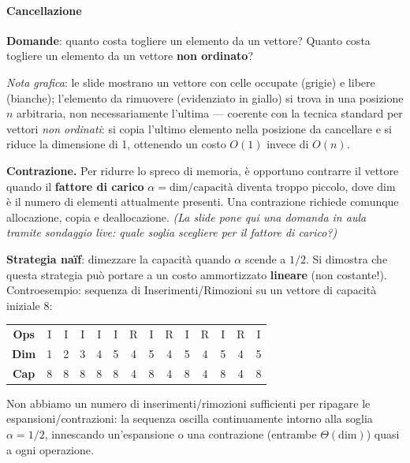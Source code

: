 \documentclass[12pt, a4paper]{article}
\begin{document}
\paragraph{Cancellazione}

\textbf{Domande}: quanto costa togliere un elemento da un vettore? Quanto costa togliere un elemento da un vettore \textbf{non ordinato}?

\textit{Nota grafica}: le slide mostrano un vettore con celle occupate (grigie) e libere (bianche); l'elemento da rimuovere (evidenziato in giallo) si trova in una posizione $n$ arbitraria, non necessariamente l'ultima — coerente con la tecnica standard per vettori \emph{non ordinati}: si copia l'ultimo elemento nella posizione da cancellare e si riduce la dimensione di 1, ottenendo un costo $O(1)$ invece di $O(n)$.

\textbf{Contrazione.} Per ridurre lo spreco di memoria, è opportuno contrarre il vettore quando il \textbf{fattore di carico} $\alpha = \text{dim}/\text{capacità}$ diventa troppo piccolo, dove $\text{dim}$ è il numero di elementi attualmente presenti. Una contrazione richiede comunque allocazione, copia e deallocazione. \textit{(La slide pone qui una domanda in aula tramite sondaggio live: quale soglia scegliere per il fattore di carico?)}

\textbf{Strategia naïf}: dimezzare la capacità quando $\alpha$ scende a $1/2$. Si dimostra che questa strategia può portare a un costo ammortizzato \textbf{lineare} (non costante!). Controesempio: sequenza di Inserimenti/Rimozioni su un vettore di capacità iniziale $8$:

\begin{center}
\begin{tabular}{c|ccccccccccccc}
\toprule
\textbf{Ops} & I & I & I & I & I & R & I & R & I & R & I & R & I \\
\textbf{Dim} & 1 & 2 & 3 & 4 & 5 & 4 & 5 & 4 & 5 & 4 & 5 & 4 & 5 \\
\textbf{Cap} & 8 & 8 & 8 & 8 & 8 & 4 & 8 & 4 & 8 & 4 & 8 & 4 & 8 \\
\bottomrule
\end{tabular}
\end{center}

\begin{tcolorbox}[colback=lightergray!5, colframe=tocsubsec, title=\textbf{Qual è il problema?}]
Non abbiamo un numero di inserimenti/rimozioni sufficienti per ripagare le espansioni/contrazioni: la sequenza oscilla continuamente intorno alla soglia $\alpha=1/2$, innescando un'espansione o una contrazione (entrambe $\Theta(\text{dim})$) quasi a ogni operazione.
\end{tcolorbox}
\end{document}
